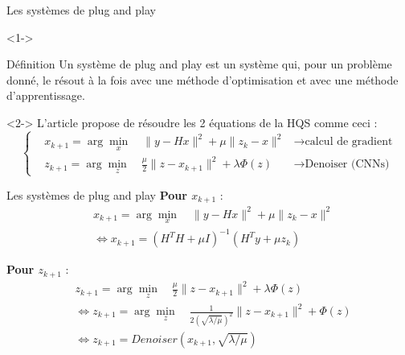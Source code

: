 \documentclass[11pt]{beamer}
\begin{document}
\begin{frame}{Les systèmes de plug and play}
    \begin{visibleenv}<1->
        \begin{exampleblock}{Définition}
            Un système de plug and play est un système qui, pour un problème donné, le résout
            à la fois avec une méthode d'optimisation et avec une méthode d'apprentissage.
        \end{exampleblock}
    \end{visibleenv}

    \begin{visibleenv}<2->
        L'article propose de résoudre les 2 équations de la HQS comme ceci :
        \begin{equation*}
            \left\{
            \begin{aligned}
                & x_{k+1} = \arg \min_x \quad \lVert y - Hx \rVert^2 + \mu \lVert z_k - x \rVert^2 &  \rightarrow \text{calcul de gradient}\\
                & z_{k+1} = \arg \min_z \quad \frac{\mu}{2}\lVert z - x_{k+1} \rVert^2 + \lambda \Phi(z) & \rightarrow \text{Denoiser (CNNs)}
            \end{aligned}
            \right.
        \end{equation*}
    \end{visibleenv}
\end{frame}


\begin{frame}{Les systèmes de plug and play}
    \textbf{Pour $x_{k+1}$} :
    \begin{align*}
        & x_{k+1} = \arg \min_x \quad \lVert y - Hx \rVert ^2 + \mu \lVert z_k - x \rVert ^2 \\
        & \Leftrightarrow x_{k+1} = (H^TH + \mu I)^{-1} (H^Ty + \mu z_k)
    \end{align*}

    \textbf{Pour $z_{k+1}$} :
    \begin{align*}
        & z_{k+1} = \arg \min_z \quad \frac{\mu}{2}\lVert z - x_{k+1} \rVert^2 + \lambda \Phi(z) \\
        & \Leftrightarrow z_{k+1} = \arg \min_z \quad \frac{1}{2 (\sqrt{\lambda / \mu}) ^2}\lVert z - x_{k+1} \rVert^2 + \Phi(z) \\
        & \Leftrightarrow z_{k+1} = Denoiser(x_{k+1}, \sqrt{\lambda / \mu})
    \end{align*}
\end{frame}
\end{document}
